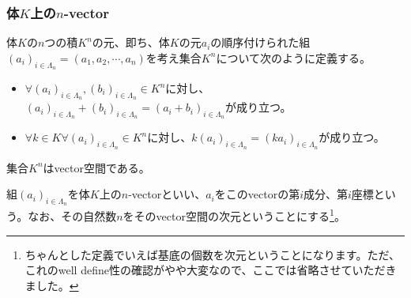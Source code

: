 \documentclass[dvipdfmx]{jsarticle}
\begin{document}
\subsubsection{体$K$上の$n$-vector}%
\begin{dfn}
体$K$の$n$つの積$K^{n}$の元、即ち、体$K$の元$a_{i}$の順序付けられた組$\left( a_{i} \right)_{i \in \varLambda_{n}} = \left( a_{1},a_{2},\cdots,a_{n} \right)$を考え集合$K^{n}$について次のように定義する。
\begin{itemize}
\item
  $\forall\left( a_{i} \right)_{i \in \varLambda_{n}},\left( b_{i} \right)_{i \in \varLambda_{n}} \in K^{n}$に対し、$\left( a_{i} \right)_{i \in \varLambda_{n}} + \left( b_{i} \right)_{i \in \varLambda_{n}} = \left( a_{i} + b_{i} \right)_{i \in \varLambda_{n}}$が成り立つ。
\item
  $\forall k \in K\forall\left( a_{i} \right)_{i \in \varLambda_{n}} \in K^{n}$に対し、${k\left( a_{i} \right)}_{i \in \varLambda_{n}} = \left( {ka}_{i} \right)_{i \in \varLambda_{n}}$が成り立つ。
\end{itemize}
\end{dfn}
\begin{thm}\label{4.1.2.2} 集合$K^{n}$はvector空間である。
\end{thm}
\begin{dfn}
組$\left( a_{i} \right)_{i \in \varLambda_{n}}$を体$K$上の$n$-vectorといい、$a_{i}$をこのvectorの第$i$成分、第$i$座標という。なお、その自然数$n$をそのvector空間の次元ということにする\footnote{ちゃんとした定義でいえば基底の個数を次元ということになります。ただ、これのwell define性の確認がやや大変なので、ここでは省略させていただきました。}。
\end{dfn}
\end{document}
